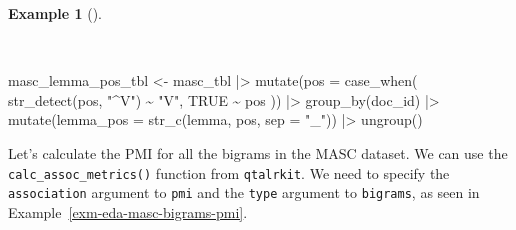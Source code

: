\documentclass[
  letterpaper,
]{latex/krantz}
\newenvironment{Shaded}{\begin{snugshade}}{\end{snugshade}}
\newcommand{\AttributeTok}[1]{\textcolor[rgb]{0.00,0.00,0.00}{#1}}
\newcommand{\ConstantTok}[1]{\textcolor[rgb]{0.00,0.00,0.00}{#1}}
\newcommand{\FunctionTok}[1]{\textcolor[rgb]{0.00,0.00,0.00}{#1}}
\newcommand{\NormalTok}[1]{\textcolor[rgb]{0.00,0.00,0.00}{#1}}
\newcommand{\OtherTok}[1]{\textcolor[rgb]{0.00,0.00,0.00}{#1}}
\newcommand{\SpecialCharTok}[1]{\textcolor[rgb]{0.00,0.00,0.00}{#1}}
\newcommand{\StringTok}[1]{\textcolor[rgb]{0.00,0.00,0.00}{#1}}
\theoremstyle{definition}
\newtheorem{example}{Example}[chapter]
\theoremstyle{remark}
\begin{document}
\begin{example}[]\protect\hypertarget{exm-eda-masc-lemma-pos}{}\label{exm-eda-masc-lemma-pos}

~

\begin{Shaded}
\begin{Highlighting}[]
\NormalTok{masc\_lemma\_pos\_tbl }\OtherTok{\textless{}{-}}
\NormalTok{  masc\_tbl }\SpecialCharTok{|\textgreater{}}
  \FunctionTok{mutate}\NormalTok{(}\AttributeTok{pos =} \FunctionTok{case\_when}\NormalTok{(}
    \FunctionTok{str\_detect}\NormalTok{(pos, }\StringTok{"\^{}V"}\NormalTok{) }\SpecialCharTok{\textasciitilde{}} \StringTok{"V"}\NormalTok{,}
    \ConstantTok{TRUE} \SpecialCharTok{\textasciitilde{}}\NormalTok{ pos}
\NormalTok{  )) }\SpecialCharTok{|\textgreater{}}
  \FunctionTok{group\_by}\NormalTok{(doc\_id) }\SpecialCharTok{|\textgreater{}}
  \FunctionTok{mutate}\NormalTok{(}\AttributeTok{lemma\_pos =} \FunctionTok{str\_c}\NormalTok{(lemma, pos, }\AttributeTok{sep =} \StringTok{"\_"}\NormalTok{)) }\SpecialCharTok{|\textgreater{}}
  \FunctionTok{ungroup}\NormalTok{()}
\end{Highlighting}
\end{Shaded}

\end{example}

Let's calculate the PMI for all the bigrams in the MASC dataset. We can
use the \texttt{calc\_assoc\_metrics()} function from \texttt{qtalrkit}.
We need to specify the \texttt{association} argument to \texttt{pmi} and
the \texttt{type} argument to \texttt{bigrams}, as seen in
Example~\ref{exm-eda-masc-bigrams-pmi}.
\end{document}
